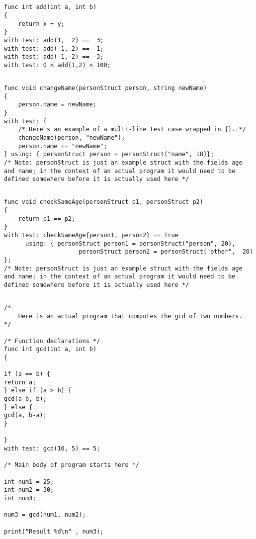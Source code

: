 \documentclass{article}
\begin{document}
\subsection{}
\begin{lstlisting}
func int add(int a, int b)
{
	return x + y;
}
with test: add(1,  2) ==  3;
with test: add(-1, 2) ==  1;
with test: add(-1,-2) == -3;
with test: 0 < add(1,2) < 100;
\end{lstlisting}


\subsection{}
\begin{lstlisting}
func void changeName(personStruct person, string newName)
{
	person.name = newName;
}
with test: {
	/* Here's an example of a multi-line test case wrapped in {}. */
	changeName(person, "newName");
	person.name == "newName";
} using: { personStruct person = personStruct("name", 18)};
/* Note: personStruct is just an example struct with the fields age and name; in the context of an actual program it would need to be defined somewhere before it is actually used here */
\end{lstlisting}


\subsection{}
\begin{lstlisting}
func void checkSameAge(personStruct p1, personStruct p2)
{
	return p1 == p2;
}
with test: checkSameAge{person1, person2} == True
	  using: { personStruct person1 = personStruct("person", 20),
				     personStruct person2 = personStruct("other",  20) };
/* Note: personStruct is just an example struct with the fields age and name; in the context of an actual program it would need to be defined somewhere before it is actually used here */
\end{lstlisting}


\subsection{}
\begin{lstlisting}
/*
	Here is an actual program that computes the gcd of two numbers.
*/

/* Function declarations */
func int gcd(int a, int b)
{

if (a == b) {
return a;
} else if (a > b) {
gcd(a-b, b);
} else {
gcd(a, b-a);
}

}
with test: gcd(10, 5) == 5;

/* Main body of program starts here */

int num1 = 25;
int num2 = 30;
int num3;

num3 = gcd(num1, num2);

print("Result %d\n" , num3);
\end{lstlisting}
\end{document}
